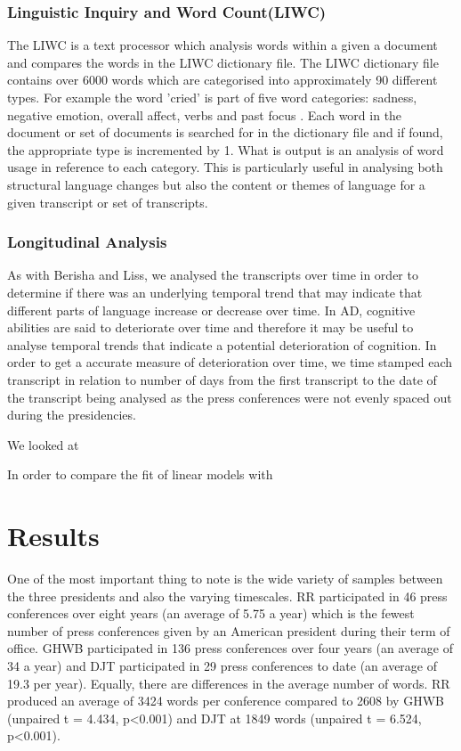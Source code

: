 \documentclass[12pt]{article}
\begin{document}
\subsubsection{Linguistic Inquiry and Word Count(LIWC)}
The LIWC is a text processor which analysis words within a given a document and compares the words in the LIWC dictionary file. The LIWC dictionary file contains over 6000 words which are categorised into approximately 90 different types. For example the word 'cried' is part of five word categories: sadness, negative emotion, overall affect, verbs and past focus \cite{Pennebaker2015}. Each word in the document or set of documents is searched for in the dictionary file and if found, the appropriate type is incremented by 1. What is output is an analysis of word usage in reference to each category. This is particularly useful in analysing both structural language changes but also the content or themes of language for a given transcript or set of transcripts.

\subsubsection{Longitudinal Analysis}
As with Berisha and Liss, we analysed the transcripts over time in order to determine if there was an underlying temporal trend that may indicate that different parts of language increase or decrease over time. In AD, cognitive abilities are said to deteriorate over time and therefore it may be useful to analyse temporal trends that indicate a potential deterioration of cognition. In order to get a accurate measure of deterioration over time, we time stamped each transcript in relation to number of days from the first transcript to the date of the transcript being analysed as the press conferences were not evenly spaced out during the presidencies.
\par
We looked at 
\par 
In order to compare the fit of linear models with 

\section{Results}\label{results}
One of the most important thing to note is the wide variety of samples between the three presidents and also the varying timescales. RR participated in 46 press conferences over eight years (an average of 5.75 a year) which is the fewest number of press conferences given by an American president during their term of office. GHWB participated in 136 press conferences over four years (an average of 34 a year) and DJT participated in 29 press conferences to date (an average of 19.3 per year). Equally, there are differences in the average number of words. RR produced an average of 3424 words per conference compared to 2608 by GHWB (unpaired t = 4.434, p\textless 0.001) and DJT at 1849 words (unpaired t = 6.524, p\textless 0.001).
\end{document}

